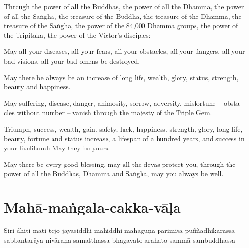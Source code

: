 \begin{english}
  \setlength{\parskip}{8pt}%
  Through the power of all the Buddhas, the power of all the Dhamma, the power of all the Saṅgha,
  the treasure of the Buddha, the treasure of the Dhamma, the treasure of the Saṅgha,
  the power of the 84,000 Dhamma groups, the power of the Tripitaka, the power
  of the Victor's disciples:

  May all your diseases, all your fears, all your obstacles,
  all your dangers, all your bad visions, all your bad omens be destroyed.

  May there be always be an increase of long life, wealth, glory, status,
  strength, beauty and happiness.

  May suffering, disease, danger, animosity, sorrow, adversity, misfortune --
  obstacles without number -- vanish through the majesty of the Triple Gem.

  Triumph, success, wealth, gain, safety, luck, happiness, strength, glory, long
  life, beauty, fortune and status increase, a lifespan of a hundred years, and
  success in your livelihood: May they be yours.

  May there be every good blessing, may all the devas protect you, through the
  power of all the Buddhas, Dhamma and Saṅgha, may you always be well.
\end{english}

\section{Mahā-maṅgala-cakka-vāḷa}


Siri-dhiti-mati-tejo-jayasiddhi-mahiddhi-mahāguṇā-parimita-puññādhikarassa
sabbantarāya-nivāraṇa-samatthassa bhagavato arahato sammā-sambuddhassa

